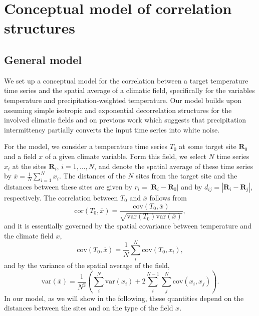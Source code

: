 \documentclass[cp, manuscript]{copernicus}
\begin{document}
\section{Conceptual model of correlation structures}
\label{app:concept.model}

\subsection{General model}
\label{app:concept.model.general}

We set up a conceptual model for the correlation between a target temperature
time series and the spatial average of a climatic field, specifically for the
variables temperature and precipitation-weighted temperature. Our model builds
upon assuming simple isotropic and exponential decorrelation structures for the
involved climatic fields and on previous work which suggests that precipitation
intermittency partially converts the input time series into white noise.

For the model, we consider a temperature time series $T_0$ at some target site
$\mathbf{R}_0$ and a field $x$ of a given climate variable. Form this field, we
select $N$ time series $x_i$ at the sites $\mathbf{R}_i$, $i=1,\dotsc,N$, and
denote the spatial average of these time series by
$\overline{x}=\frac{1}{N}\sum_{i=1}^{N}{x_i}$. The distances of the $N$ sites
from the target site and the distances between these sites are given by
$r_i=|\mathbf{R}_i-\mathbf{R}_0|$ and by $d_{ij}=|{\mathbf{R}_i-\mathbf{R}_j}|$,
respectively. The correlation between $T_0$ and $\overline{x}$ follows from
%
\begin{equation}
\label{eq:corr.general}
\mathrm{cor}(T_0,\overline{x})=\frac
{\mathrm{cov}(T_0,\overline{x})}
{\sqrt{\mathrm{var}(T_0)\mathrm{var}(\overline{x})}},
\end{equation}
and it is essentially governed by the spatial covariance between temperature and
the climate field $x$,
%
\begin{equation}
\label{eq:cov.general}
\mathrm{cov}(T_0,\overline{x})=
\frac{1}{N}\sum_{i}^{N}{\mathrm{cov}(T_0,x_i)},
\end{equation}
%
and by the variance of the spatial average of the field,
\begin{equation}
\label{eq:var.general}
\mathrm{var}(\overline{x})=
\frac{1}{N^2}\left(
\sum_{i}^{N}{\mathrm{var}(x_i)} +
2\sum_{i}^{N-1}\sum_{j}^{N}{\mathrm{cov}(x_i,x_j)}
\right).
\end{equation}
%
In our model, as we will show in the following, these quantities depend on the
distances between the sites and on the type of the field $x$.
\end{document}
